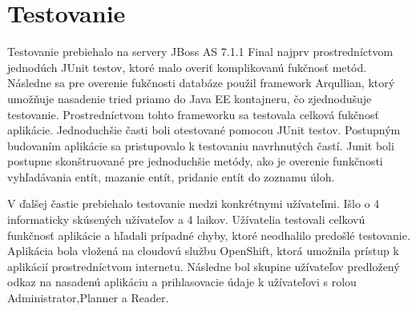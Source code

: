 	



 
\section{Testovanie}
Testovanie prebiehalo na servery JBoss AS 7.1.1 Final najprv prostredníctvom jednodúch JUnit testov, ktoré malo overiť komplikovanú fukčnosť metód. Následne sa pre overenie fukčnosti databáze použil framework Arqullian, ktorý umožňuje nasadenie tried priamo do Java EE kontajneru, čo zjednodušuje testovanie. Prostredníctvom tohto frameworku sa testovala celková fukčnosť aplikácie. Jednoduchšie časti boli otestované pomocou JUnit testov. Postupným budovaním aplikácie sa pristupovalo k testovaniu navrhnutých častí. Junit boli postupne skonštruované pre jednoduchšie metódy, ako je overenie funkčnosti vyhľadávania entít, mazanie entít, pridanie entít do zoznamu úloh. 


V ďalšej častie prebiehalo testovanie medzi konkrétnymi užívateľmi. Išlo o 4 informaticky skúsených užívateľov a 4 laikov. Užívatelia testovali celkovú funkčnosť aplikácie a hľadali prípadné chyby, ktoré neodhalilo predošlé testovanie. Aplikácia bola vložená na cloudovú službu OpenShift, ktorá umožnila prístup k aplikácií prostredníctvom internetu. Následne bol skupine užívateľov predložený odkaz na nasadenú aplikáciu a prihlasovacie údaje k užívateľovi s rolou Administrator,Planner a Reader. 

